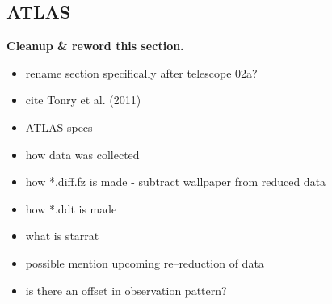 \documentclass[aps,prb,twocolumn,superscriptaddress]{revtex4-1}
\begin{document}
\subsection{ATLAS}
{\bf Cleanup \& reword this section.\\}

\begin{itemize}
	\item{} rename section specifically after telescope 02a?
	\item{} cite Tonry et al. (2011)~\cite{ATLAS_data}
	\item{} ATLAS specs~\cite{ATLAS_data}
	\item{} how data was collected
	\item{} how *.diff.fz is made - subtract wallpaper from reduced data
	\item{} how *.ddt is made
	\item{} what is starrat
	\item{} possible mention upcoming re--reduction of data
	\item{} is there an offset in observation pattern?
\end{itemize}
\end{document}
